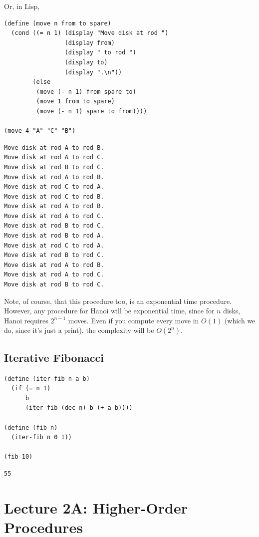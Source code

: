 \documentclass[9pt]{report}
\begin{document}
Or, in Lisp,

\begin{verbatim}
(define (move n from to spare)
  (cond ((= n 1) (display "Move disk at rod ")
                 (display from)
                 (display " to rod ")
                 (display to)
                 (display ".\n"))
        (else
         (move (- n 1) from spare to)
         (move 1 from to spare)
         (move (- n 1) spare to from))))

(move 4 "A" "C" "B")
\end{verbatim}

\begin{verbatim}
Move disk at rod A to rod B.
Move disk at rod A to rod C.
Move disk at rod B to rod C.
Move disk at rod A to rod B.
Move disk at rod C to rod A.
Move disk at rod C to rod B.
Move disk at rod A to rod B.
Move disk at rod A to rod C.
Move disk at rod B to rod C.
Move disk at rod B to rod A.
Move disk at rod C to rod A.
Move disk at rod B to rod C.
Move disk at rod A to rod B.
Move disk at rod A to rod C.
Move disk at rod B to rod C.
\end{verbatim}

Note, of course, that this procedure too, is an exponential time
procedure. However, any procedure for Hanoi will be exponential
time, since for \(n\) disks, Hanoi requires \(2^{n-1}\) moves. Even if
you compute every move in \(O(1)\) (which we do, since it's just a
print), the complexity will be \(O(2^n)\).

\section{Iterative Fibonacci}
\label{sec:org96b0429}

\begin{verbatim}
(define (iter-fib n a b)
  (if (= n 1)
      b
      (iter-fib (dec n) b (+ a b))))

(define (fib n)
  (iter-fib n 0 1))

(fib 10)
\end{verbatim}

\begin{verbatim}
55
\end{verbatim}

\chapter{Lecture 2A: Higher-Order Procedures}
\label{sec:orge150a3f}
\end{document}
